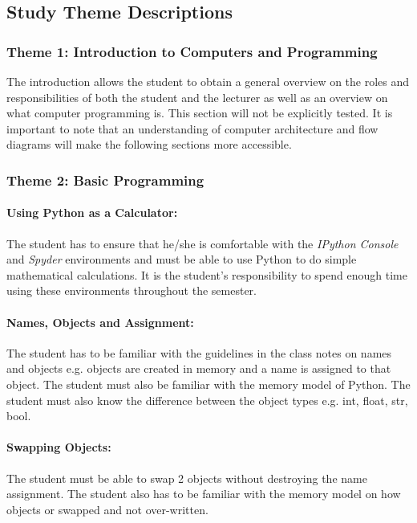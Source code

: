     \subsection{Study Theme Descriptions}
        \subsubsection{Theme 1: Introduction to Computers and Programming}
            The introduction allows the student to obtain a general overview on
            the roles and responsibilities of both the student and the lecturer
            as well as an overview on what computer programming is.
            This section will not be explicitly tested. It is important to note
            that an understanding of computer architecture and flow diagrams
            will make the following sections more accessible.

        \subsubsection{Theme 2: Basic Programming}
            \paragraph{Using Python as a Calculator:}
                The student has to ensure that he/she is comfortable with the
                \emph{IPython Console} and \emph{Spyder} environments and must
                be able to use Python to do simple mathematical calculations.
                It is the student's responsibility to spend enough time using
                these environments throughout the semester.

            \paragraph{Names, Objects and Assignment:}
                The student has to be familiar with the guidelines in the class
                notes on names and objects e.g. objects are created in memory
                and a name is assigned to that object. The student must also
                be familiar with the memory model of Python. The student must
                also know the difference between the object types e.g. int,
                float, str, bool.

            \paragraph{Swapping Objects:}
                The student must be able to swap 2 objects without destroying
                the name assignment. The student also has to be familiar with
                the memory model on how objects or swapped and not over-written.

